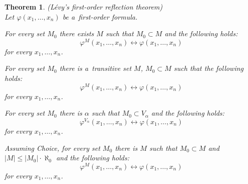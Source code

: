 \documentclass[12pt,a4paper]{article}
\newtheorem{theorem}{Theorem}[section]
\renewcommand{\iff}{\leftrightarrow}
\newcommand{\bce}{\begin{compactenum}}
\newcommand{\ece}{\end{compactenum}}
\begin{document}
\begin{theorem}{(Lévy's first-order reflection theorem)}\label{theorem:first_order_reflection}\\
Let $\varphi(x_1, \ldots, x_n)$ be a~first-order formula.
\bce[(i)]
\item For every set $M_0$ there exists $M$ such that $M_0 \subset M$ and the following holds:
\begin{equation}
\varphi^M(x_1, \ldots, x_n) \iff \varphi(x_1, \ldots, x_n)
\end{equation}
for every $x_1, \ldots, x_n$.

\item For every set $M_0$  there is a~transitive set $M$, $M_0 \subset M$ such that the following holds:
\begin{equation}
\varphi^M(x_1, \ldots, x_n) \iff \varphi(x_1, \ldots, x_n)
\end{equation}
for every $x_1, \ldots, x_n$.

\item For every set $M_0$ there is $\alpha$ such that $M_0 \subset V_{\alpha}$ and the following holds:
\begin{equation}
\varphi^{V_{\alpha}}(x_1, \ldots, x_n) \iff \varphi(x_1, \ldots, x_n)
\end{equation}
for every $x_1, \ldots, x_n$.

\item Assuming \emph{Choice}, for every set $M_0$ there is $M$ such that $M_0 \subset M$ and $|M| \leq |M_0| \cdot \aleph_0$ and the following holds:
\begin{equation}
\varphi^M(x_1, \ldots, x_n) \iff \varphi(x_1, \ldots, x_n)
\end{equation}
for every $x_1, \ldots, x_n$.
\ece
\end{theorem}
\end{document}
